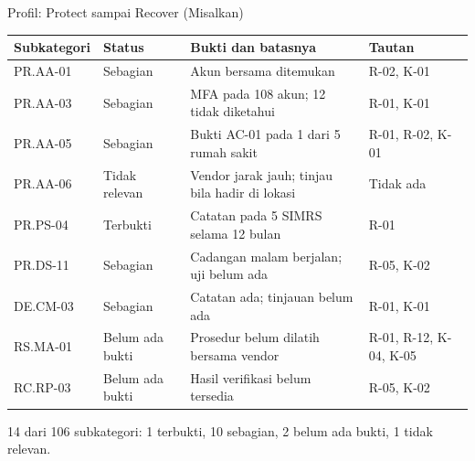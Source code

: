 \documentclass[aspectratio=169, table, 12pt]{beamer}
\begin{document}
\begin{frame}{{\Large Profil: Protect sampai Recover (Misalkan)}}
  \vspace{2pt}
  \scriptsize
  \begin{tabularx}{\textwidth}{|>{\raggedright\arraybackslash}p{}|>{\raggedright\arraybackslash}p{}|>{\raggedright\arraybackslash}X|>{\raggedright\arraybackslash}p{}|}
    \hline
    \textbf{Subkategori} & \textbf{Status} & \textbf{Bukti dan batasnya} & \textbf{Tautan} \\ \hline
    PR.AA-01 & Sebagian & Akun bersama ditemukan & R-02, K-01 \\ \hline
    PR.AA-03 & Sebagian & MFA pada 108 akun; 12 tidak diketahui & R-01, K-01 \\ \hline
    PR.AA-05 & Sebagian & Bukti AC-01 pada 1 dari 5 rumah sakit & R-01, R-02, K-01 \\ \hline
    PR.AA-06 & Tidak relevan & Vendor jarak jauh; tinjau bila hadir di lokasi & Tidak ada \\ \hline
    PR.PS-04 & Terbukti & Catatan pada 5 SIMRS selama 12 bulan & R-01 \\ \hline
    PR.DS-11 & Sebagian & Cadangan malam berjalan; uji belum ada & R-05, K-02 \\ \hline
    DE.CM-03 & Sebagian & Catatan ada; tinjauan belum ada & R-01, K-01 \\ \hline
    RS.MA-01 & Belum ada bukti & Prosedur belum dilatih bersama vendor & R-01, R-12, K-04, K-05 \\
    \hline
    RC.RP-03 & Belum ada bukti & Hasil verifikasi belum tersedia & R-05, K-02 \\ \hline
  \end{tabularx}

  \vspace{4pt}
  \small 14 dari 106 subkategori: 1 terbukti, 10 sebagian, 2 belum ada bukti, 1 tidak relevan.
\end{frame}
\end{document}
